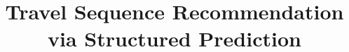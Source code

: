\documentclass[letterpaper]{article} %
\title{Travel Sequence Recommendation via Structured Prediction}
\begin{document}
\maketitle

\begin{abstract}

\end{abstract}








%


\fontsize{9.5pt}{10.5pt} \selectfont



\clearpage
\onecolumn

\end{document}
